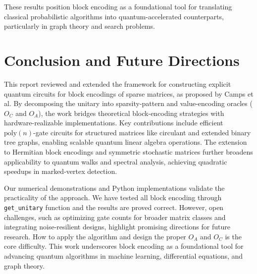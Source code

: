 \documentclass{article}
\begin{document}
    These results position block encoding as a foundational tool for translating classical probabilistic algorithms into quantum-accelerated counterparts, particularly in graph theory and search problems.

    \section{Conclusion and Future Directions}
    
    This report reviewed and extended the framework for constructing explicit quantum circuits for block encodings of sparse matrices, as proposed by Camps et al. By decomposing the unitary into sparsity-pattern and value-encoding oracles ($O_C$ and $O_A$), the work bridges theoretical block-encoding strategies with hardware-realizable implementations. Key contributions include efficient $\mathrm{poly}(n)$-gate circuits for structured matrices like circulant and extended binary tree graphs, enabling scalable quantum linear algebra operations. The extension to Hermitian block encodings and symmetric stochastic matrices further broadens applicability to quantum walks and spectral analysis, achieving quadratic speedups in marked-vertex detection.
    
    Our numerical demonstrations and Python implementations validate the practicality of the approach. We have tested all block encoding through \texttt{get\_unitary} function and the results are proved correct. However, open challenges, such as optimizing gate counts for broader matrix classes and integrating noise-resilient designs, highlight promising directions for future research. How to apply the algorithm and design the proper $O_A$ and $O_C$ is the core difficulty. This work underscores block encoding as a foundational tool for advancing quantum algorithms in machine learning, differential equations, and graph theory.

    
    
\end{document}
